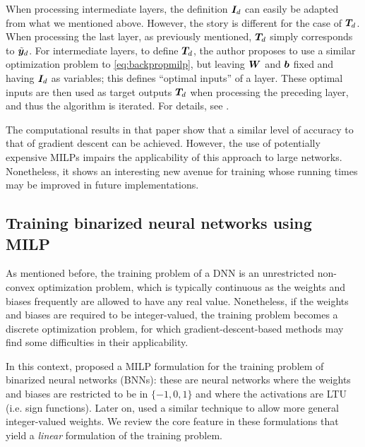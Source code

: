When processing intermediate layers, the definition ${\bm{I}}_d$ can easily be adapted from what we mentioned above. However, the story is different for the case of ${\bm{T}}_d$. When processing the last layer, as previously mentioned, ${\bm{T}}_d$ simply corresponds to $\tilde{{\bm{y}}}_d$. For intermediate layers, to define ${\bm{T}}_d$, the author proposes to use a similar optimization problem to \eqref{eq:backpropmilp}, but leaving ${\bm{W}}$ and ${\bm{b}}$ fixed and having ${\bm{I}}_d$ as variables; this defines ``optimal inputs'' of a layer. These optimal inputs are then used as target outputs ${\bm{T}}_d$ when processing the preceding layer, and thus the algorithm is iterated. For details, see \cite{goebbelstraining2021}.

The computational results in that paper show that a similar level of accuracy to that of gradient descent can be achieved. However, the use of potentially expensive MILPs impairs the applicability of this approach to large networks. Nonetheless, it shows an interesting new avenue for training whose running times may be improved in future implementations.

\subsection{Training binarized neural networks using MILP}

As mentioned before, the training problem of a DNN is an unrestricted non-convex optimization
problem, which is typically continuous as the weights and biases frequently are allowed to have any real value.
%
Nonetheless, if the weights and biases are required to be integer-valued, the training
problem becomes a discrete optimization problem, for which gradient-descent-based methods may find some difficulties in their applicability.

In this context, \cite{icarte2019training} proposed a MILP formulation for the training problem of  binarized neural networks (BNNs): these are neural networks where the weights and biases are restricted to be in $\{-1,0,1\}$ and where the activations are LTU (i.e. sign functions). Later on, \cite{thorbjarnarson2020training,thorbjarnarson2023optimal} used a similar technique to allow more general integer-valued weights. We review the core feature in these formulations that yield a \emph{linear} formulation of the training problem. 

